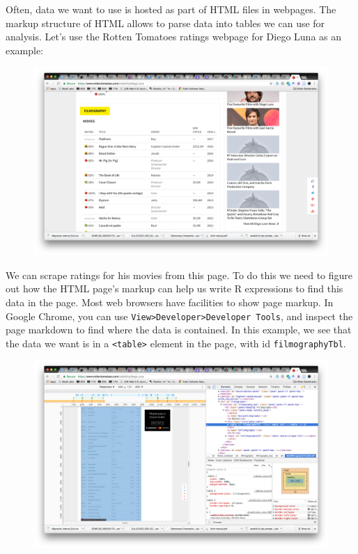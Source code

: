 \documentclass[]{article}
\theoremstyle{definition}
\theoremstyle{definition}
\theoremstyle{remark}
\begin{document}
Often, data we want to use is hosted as part of HTML files in webpages.
The markup structure of HTML allows to parse data into tables we can use
for analysis. Let's use the Rotten Tomatoes ratings webpage for Diego
Luna as an example:

\begin{figure}[htbp]
\centering
\includegraphics{img/rt_diegoluna.png}
\caption{}
\end{figure}

We can scrape ratings for his movies from this page. To do this we need
to figure out how the HTML page's markup can help us write R expressions
to find this data in the page. Most web browsers have facilities to show
page markup. In Google Chrome, you can use
\texttt{View\textgreater{}Developer\textgreater{}Developer\ Tools}, and
inspect the page markdown to find where the data is contained. In this
example, we see that the data we want is in a
\texttt{\textless{}table\textgreater{}} element in the page, with id
\texttt{filmographyTbl}.

\begin{figure}[htbp]
\centering
\includegraphics{img/rt_devtools.png}
\caption{}
\end{figure}
\end{document}
